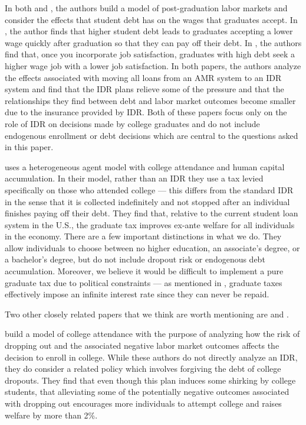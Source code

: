   In both \cite{Ji2017} and \cite{LuoMongey2019}, the authors build a model of post-graduation labor
  markets and consider the effects that student debt has on the wages that graduates accept. In
  \cite{Ji2017}, the author finds that higher student debt leads to graduates accepting a lower wage
  quickly after graduation so that they can pay off their debt. In \cite{LuoMongey2019}, the
  authors find that, once you incorporate job satisfaction, graduates with high debt seek a higher
  wage job with a lower job satisfaction. In both papers, the authors analyze the effects associated
  with moving all loans from an AMR system to an IDR system and find that the IDR plans relieve
  some of the pressure and that the relationships they find between debt and labor market outcomes
  become smaller due to the insurance provided by IDR. Both of these papers focus only on the role
  of IDR on decisions made by college graduates and do not include endogenous enrollment or debt
  decisions which are central to the questions asked in this paper.

  \cite{HeijdraKindermannReijnders2017} uses a heterogeneous agent model with college attendance and
  human capital accumulation. In their model, rather than an IDR they use a tax levied specifically
  on those who attended college --- this differs from the standard IDR in the sense that it is
  collected indefinitely and not stopped after an individual finishes paying off their debt. They
  find that, relative to the current student loan system in the U.S., the graduate tax improves
  ex-ante welfare for all individuals in the economy. There are a few important distinctions in what
  we do. They allow individuals to choose between no higher education, an associate's degree, or a
  bachelor's degree, but do not include dropout risk or endogenous debt accumulation. Moreover, we
  believe it would be difficult to implement a pure graduate tax due to political constraints --- as
  mentioned in \cite{BarrChapmanDeardenDynarski2018}, graduate taxes effectively impose an infinite
  interest rate since they can never be repaid.

  Two other closely related papers that we think are worth mentioning are
  \cite{ChatterjeeIonescu2012} and \cite{CaiChapmanWang2018}.

  \cite{ChatterjeeIonescu2012} build a model of college attendance with the purpose of analyzing how
  the risk of dropping out and the associated negative labor market outcomes affects the decision to
  enroll in college. While these authors do not directly analyze an IDR, they do consider a related
  policy which involves forgiving the debt of college dropouts. They find that even though this plan
  induces some shirking by college students, that alleviating some of the potentially negative
  outcomes associated with dropping out encourages more individuals to attempt college and raises
  welfare by more than 2\%.

